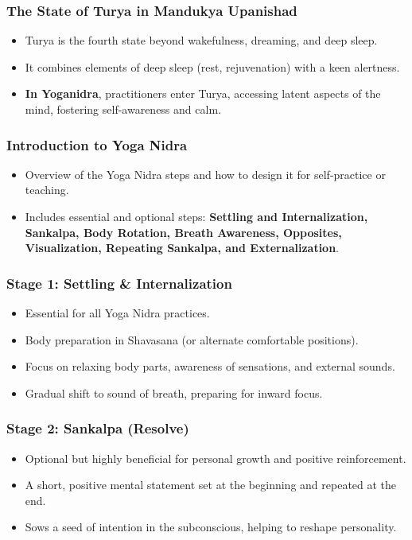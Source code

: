 \begin{frame}[fragile]\frametitle{The State of Turya in Mandukya Upanishad}
    \begin{itemize}
        \item Turya is the fourth state beyond wakefulness, dreaming, and deep sleep.
        \item It combines elements of deep sleep (rest, rejuvenation) with a keen alertness.
        \item \textbf{In Yoganidra}, practitioners enter Turya, accessing latent aspects of the mind, fostering self-awareness and calm.
    \end{itemize}
\end{frame}



\begin{frame}[fragile]\frametitle{Introduction to Yoga Nidra}
    \begin{itemize}
        \item Overview of the Yoga Nidra steps and how to design it for self-practice or teaching.
        \item Includes essential and optional steps: \textbf{Settling and Internalization, Sankalpa, Body Rotation, Breath Awareness, Opposites, Visualization, Repeating Sankalpa, and Externalization}.
    \end{itemize}
\end{frame}

\begin{frame}[fragile]\frametitle{Stage 1: Settling \& Internalization}
    \begin{itemize}
        \item Essential for all Yoga Nidra practices.
        \item Body preparation in Shavasana (or alternate comfortable positions).
        \item Focus on relaxing body parts, awareness of sensations, and external sounds.
        \item Gradual shift to sound of breath, preparing for inward focus.
    \end{itemize}
\end{frame}

\begin{frame}[fragile]\frametitle{Stage 2: Sankalpa (Resolve)}
    \begin{itemize}
        \item Optional but highly beneficial for personal growth and positive reinforcement.
        \item A short, positive mental statement set at the beginning and repeated at the end.
        \item Sows a seed of intention in the subconscious, helping to reshape personality.
    \end{itemize}
\end{frame}

